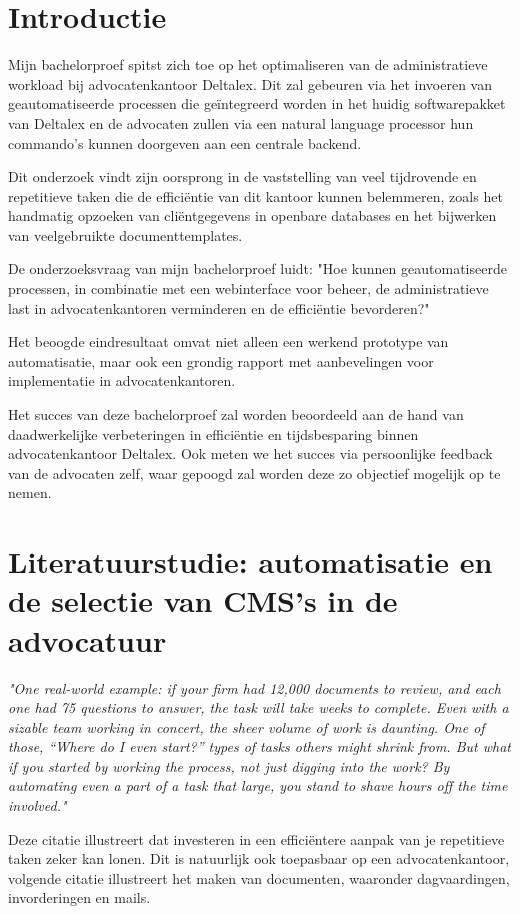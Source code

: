 \section{Introductie}%
\label{sec:introductie}
Mijn bachelorproef spitst zich toe op het optimaliseren van de administratieve workload bij advocatenkantoor Deltalex. Dit zal gebeuren via het invoeren van geautomatiseerde processen die geïntegreerd worden in het huidig softwarepakket van Deltalex en de advocaten zullen via een natural language processor hun commando's kunnen doorgeven aan een centrale backend. 

Dit onderzoek vindt zijn oorsprong in de vaststelling van veel tijdrovende en repetitieve taken die de efficiëntie van dit kantoor kunnen belemmeren,
zoals het handmatig opzoeken van cliëntgegevens in openbare databases en het bijwerken van veelgebruikte documenttemplates.

De onderzoeksvraag van mijn bachelorproef luidt: "Hoe kunnen geautomatiseerde processen, in combinatie met een webinterface voor beheer, de administratieve
last in advocatenkantoren verminderen en de efficiëntie bevorderen?"

Het beoogde eindresultaat omvat niet alleen een werkend prototype van automatisatie,
maar ook een grondig rapport met aanbevelingen voor implementatie in advocatenkantoren.

Het succes van deze bachelorproef zal worden beoordeeld aan de hand van daadwerkelijke verbeteringen in efficiëntie en
tijdsbesparing binnen advocatenkantoor Deltalex. Ook meten we het succes via persoonlijke feedback van de advocaten zelf, waar gepoogd zal worden deze zo objectief mogelijk op te nemen.

\section{Literatuurstudie: automatisatie en de selectie van CMS's in de advocatuur}%
\label{sec:state-of-the-art}

\begin{displayquote}
    \textit{"One real-world example: if your firm had 12,000 documents to review, and each one had 75 questions to answer, the task will take weeks to complete. Even with a sizable team working in concert, the sheer volume of work is daunting. One of those, “Where do I even start?” types of tasks others might shrink from.
    But what if you started by working the process, not just digging into the work? By automating even a part of a task that large, you stand to shave hours off the time involved."}
    \autocite{ThomsonReuters2023}
\end{displayquote}
Deze citatie illustreert dat investeren in een efficiëntere aanpak van je repetitieve taken zeker kan lonen. Dit is natuurlijk ook toepasbaar op een advocatenkantoor, volgende citatie illustreert het maken van documenten, waaronder dagvaardingen, invorderingen en mails.

